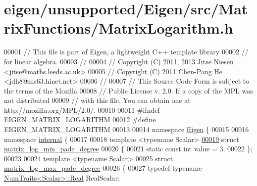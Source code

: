 \hypertarget{eigen_2unsupported_2_eigen_2src_2_matrix_functions_2_matrix_logarithm_8h_source}{}\section{eigen/unsupported/\+Eigen/src/\+Matrix\+Functions/\+Matrix\+Logarithm.h}
\label{eigen_2unsupported_2_eigen_2src_2_matrix_functions_2_matrix_logarithm_8h_source}

\begin{DoxyCode}
00001 \textcolor{comment}{// This file is part of Eigen, a lightweight C++ template library}
00002 \textcolor{comment}{// for linear algebra.}
00003 \textcolor{comment}{//}
00004 \textcolor{comment}{// Copyright (C) 2011, 2013 Jitse Niesen <jitse@maths.leeds.ac.uk>}
00005 \textcolor{comment}{// Copyright (C) 2011 Chen-Pang He <jdh8@ms63.hinet.net>}
00006 \textcolor{comment}{//}
00007 \textcolor{comment}{// This Source Code Form is subject to the terms of the Mozilla}
00008 \textcolor{comment}{// Public License v. 2.0. If a copy of the MPL was not distributed}
00009 \textcolor{comment}{// with this file, You can obtain one at http://mozilla.org/MPL/2.0/.}
00010 
00011 \textcolor{preprocessor}{#ifndef EIGEN\_MATRIX\_LOGARITHM}
00012 \textcolor{preprocessor}{#define EIGEN\_MATRIX\_LOGARITHM}
00013 
00014 \textcolor{keyword}{namespace }\hyperlink{namespace_eigen}{Eigen} \{ 
00015 
00016 \textcolor{keyword}{namespace }\hyperlink{namespaceinternal}{internal} \{ 
00017 
00018 \textcolor{keyword}{template} <\textcolor{keyword}{typename} Scalar>
\hyperlink{struct_eigen_1_1internal_1_1matrix__log__min__pade__degree}{00019} \textcolor{keyword}{struct }\hyperlink{struct_eigen_1_1internal_1_1matrix__log__min__pade__degree}{matrix\_log\_min\_pade\_degree} 
00020 \{
00021   \textcolor{keyword}{static} \textcolor{keyword}{const} \textcolor{keywordtype}{int} value = 3;
00022 \};
00023 
00024 \textcolor{keyword}{template} <\textcolor{keyword}{typename} Scalar>
\hyperlink{struct_eigen_1_1internal_1_1matrix__log__max__pade__degree}{00025} \textcolor{keyword}{struct }\hyperlink{struct_eigen_1_1internal_1_1matrix__log__max__pade__degree}{matrix\_log\_max\_pade\_degree} 
00026 \{
00027   \textcolor{keyword}{typedef} \textcolor{keyword}{typename} \hyperlink{group___core___module_struct_eigen_1_1_num_traits}{NumTraits<Scalar>::Real} RealScalar;

\end{DoxyCode}
